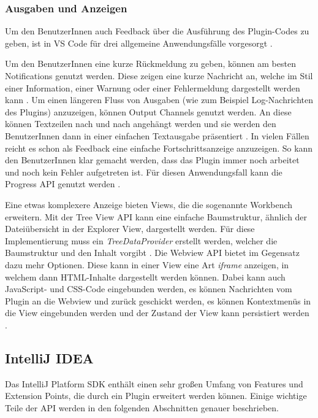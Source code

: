 \subsubsection{Ausgaben und Anzeigen}
  Um den BenutzerInnen auch Feedback über die Ausführung des Plugin-Codes zu geben, 
  ist in VS Code für drei allgemeine Anwendungsfälle vorgesorgt 
  \cite{VSCodeExtensionAPICommonCapabilities}. 
  
  Um den BenutzerInnen eine kurze 
  Rückmeldung zu geben, können am besten Notifications genutzt werden. Diese zeigen eine kurze 
  Nachricht an, welche im Stil einer Information, einer Warnung oder einer Fehlermeldung 
  dargestellt werden kann \cite{VSCodeExtensionAPINotifications}. 
  Um einen längeren Fluss von Ausgaben (wie zum Beispiel Log-Nachrichten 
  des Plugins) anzuzeigen, können Output Channels genutzt werden. An diese können Textzeilen nach 
  und nach angehängt werden und sie werden den BenutzerInnen dann in einer einfachen Textausgabe präsentiert
  \cite{VSCodeExtensionAPIOutputChannel}. 
  In vielen Fällen reicht es schon als Feedback eine einfache Fortschrittsanzeige anzuzeigen. So kann den 
  BenutzerInnen klar gemacht werden, dass das Plugin immer noch arbeitet und noch kein Fehler aufgetreten 
  ist. Für diesen Anwendungsfall kann die Progress API genutzt werden
  \cite{VSCodeExtensionAPIProgress}.

  Eine etwas komplexere Anzeige bieten Views, die die sogenannte Workbench erweitern.
  Mit der Tree View API kann eine einfache Baumstruktur, ähnlich der 
  Dateiübersicht in der Explorer View, dargestellt werden. Für diese Implementierung
  muss ein \emph{TreeDataProvider} erstellt werden, welcher die Baumstruktur und
  den Inhalt vorgibt \cite{VSCodeExtensionAPITreeViewAPI}. 
  Die Webview API bietet im Gegensatz dazu mehr
  Optionen. Diese kann in einer View eine Art \emph{iframe} anzeigen, in welchem
  dann HTML-Inhalte dargestellt werden können. Dabei kann auch JavaScript- und CSS-Code eingebunden
  werden, es können Nachrichten vom Plugin an die Webview und zurück geschickt werden, 
  es können Kontextmenüs in die View eingebunden werden und der Zustand der View
  kann persistiert werden \cite{VSCodeExtensionAPIWebviewAPI}.

\subsection{IntelliJ IDEA}

Das IntelliJ Platform SDK enthält einen sehr großen Umfang von Features und Extension Points,
die durch ein Plugin erweitert werden können. Einige wichtige Teile der API werden in den 
folgenden Abschnitten genauer beschrieben.

